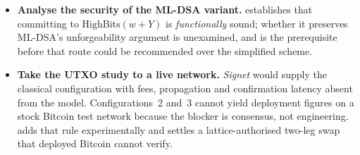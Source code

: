 \begin{itemize}
        and at the largest, one transaction exceeded by derivation. Fitting is not the same as being worth doing: settlement
        remains far above a classical claim, and the hash is the dominant measured term. A
        draft ML-DSA verification precompile covers NIST level~II only \cite{eip8051} and
        was declined from the next scheduled upgrade \cite{eip7773}; it would not verify
        LAS, bearing instead on the ML-DSA route above, whose adapted signatures a stock
        FIPS~204 verifier accepts.
  \item \textbf{Analyse the security of the ML-DSA variant.} 
        establishes that committing to $\mathrm{HighBits}(w+Y)$ is \emph{functionally}
        sound; whether it preserves ML-DSA's unforgeability argument is unexamined, and is
        the prerequisite before that route could be recommended over the simplified scheme.
  \enlargethispage{\baselineskip}
  \item \textbf{Take the UTXO study to a live network.} \emph{Signet} would supply the
        classical configuration with fees, propagation and confirmation latency absent from
        the model. Configurations~2 and~3 cannot yield deployment figures on a stock Bitcoin
        test network because the blocker is consensus, not engineering. 
        adds that rule experimentally and settles a lattice-authorised two-leg swap that
        deployed Bitcoin cannot verify.
\end{itemize}
